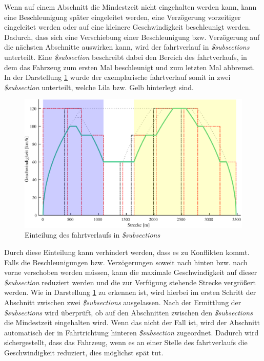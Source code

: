 Wenn auf einem Abschnitt die Mindestzeit nicht eingehalten werden kann, kann eine Beschleunigung später eingeleitet werden, eine Verzögerung vorzeitiger eingeleitet werden oder auf eine kleinere Geschwindigkeit beschleunigt werden. Dadurch, dass sich eine Verschiebung einer Beschleunigung bzw. Verzögerung auf die nächsten Abschnitte auswirken kann, wird der \Gls{fahrtverlauf} in \textit{\$subsections} unterteilt. Eine \textit{\$subsection} beschreibt dabei den Bereich des \Gls{fahrtverlauf}s, in dem das Fahrzeug zum ersten Mal beschleunigt und zum letzten Mal abbremst. In der Darstellung \ref{fig:it7} wurde der exemplarische \Gls{fahrtverlauf} somit in zwei \textit{\$subsection} unterteilt, welche Lila bzw. Gelb hinterlegt sind.
\begin{figure}
\includegraphics[width=\linewidth]{../images/matlab/it7.pdf}
\caption{Einteilung des \Gls{fahrtverlauf}s in \textit{\$subsections}}
\label{fig:it7}
\end{figure}
Durch diese Einteilung kann verhindert werden, dass es zu Konflikten kommt. Falls die Beschleunigungen bzw. Verzögerungen soweit nach hinten bzw. nach vorne verschoben werden müssen, kann die maximale Geschwindigkeit auf dieser \textit{\$subsection} reduziert werden und die zur Verfügung stehende Strecke vergrößert werden. Wie in Darstellung \ref{fig:it7} zu erkennen ist, wird hierbei im ersten Schritt der Abschnitt zwischen zwei \textit{\$subsections} ausgelassen. Nach der Ermittlung der \textit{\$subsections} wird überprüft, ob auf den Abschnitten zwischen den \textit{\$subsections} die Mindestzeit eingehalten wird. Wenn das nicht der Fall ist, wird der Abschnitt automatisch der in Fahrtrichtung hinteren \textit{\$subsection} zugeordnet. Dadurch wird sichergestellt, dass das Fahrzeug, wenn es an einer Stelle des \Gls{fahrtverlauf}s die Geschwindigkeit reduziert, dies möglichst spät tut.

